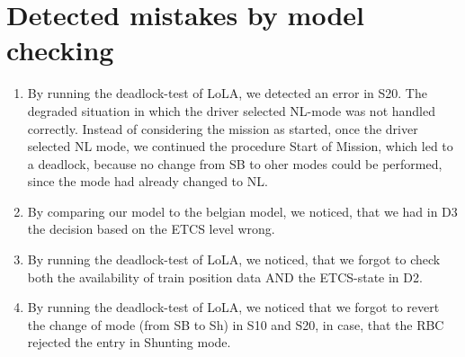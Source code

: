 \documentclass{template/openetcs_article}
\begin{document}
\section{Detected mistakes by model checking}

\begin{enumerate}

\item By running the deadlock-test of LoLA, we detected an error in S20. The degraded situation in which the driver selected NL-mode was not handled correctly. Instead of considering the mission as started, once the driver selected NL mode, we continued the procedure Start of Mission, which led to a deadlock, because no change from SB to oher modes could be performed, since the mode had already changed to NL.

\item By comparing our model to the belgian model, we noticed, that we had in D3 the decision based on the ETCS level wrong. 

\item By running the deadlock-test of LoLA, we noticed, that we forgot to check both the availability of train position data AND the ETCS-state in D2.

\item By running the deadlock-test of LoLA, we noticed that we forgot to revert the change of mode (from SB to Sh) in S10 and S20, in case, that the RBC rejected the entry in Shunting mode.


\end{enumerate}





%

\end{document}
